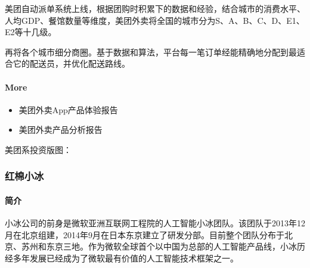 \documentclass[letterpaper,11pt,english]{sphinxmanual}
\begin{document}
美团自动派单系统上线，根据团购时积累下的数据和经验，结合城市的消费水平、人均GDP、餐馆数量等维度，美团外卖将全国的城市分为S、A、B、C、D、E1、E2等十几级。

再将各个城市细分商圈。基于数据和算法，平台每一笔订单经能精确地分配到最适合它的配送员，并优化配送路线。%
\begin{footnote}[929]\sphinxAtStartFootnote
{}
%
\end{footnote}


\paragraph{More}
\label{\detokenize{chapter_company/meituan:more}}\begin{itemize}
\item {} 
美团外卖App产品体验报告%
\begin{footnote}[930]\sphinxAtStartFootnote
{}
%
\end{footnote}

\item {} 
美团外卖产品分析报告%
\begin{footnote}[931]\sphinxAtStartFootnote
{}
%
\end{footnote}

\end{itemize}

美团系投资版图：


\subsubsection{红棉小冰}
\label{\detokenize{chapter_company/xiaoice:id1}}\label{\detokenize{chapter_company/xiaoice::doc}}

\paragraph{简介}
\label{\detokenize{chapter_company/xiaoice:id2}}
小冰公司的前身是微软亚洲互联网工程院的人工智能小冰团队。该团队于2013年12月在北京组建，2014年9月在日本东京建立了研发分部。目前整个团队分布于北京、苏州和东京三地。作为微软全球首个以中国为总部的人工智能产品线，小冰历经多年发展已经成为了微软最有价值的人工智能技术框架之一。
\end{document}
